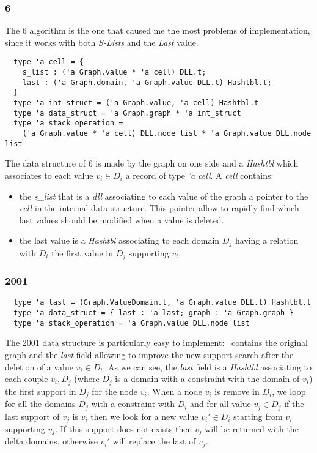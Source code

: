 \documentclass{rapport}
\begin{document}
\subsubsection{\ac{6}}

The \ac{6} algorithm is the one that caused me the most problems of implementation, since it works with both \textit{S-Lists} and the \textit{Last} value.

\begin{verbatim}
  type 'a cell = {
    s_list : ('a Graph.value * 'a cell) DLL.t;
    last : ('a Graph.domain, 'a Graph.value DLL.t) Hashtbl.t;
  }
  type 'a int_struct = ('a Graph.value, 'a cell) Hashtbl.t
  type 'a data_struct = 'a Graph.graph * 'a int_struct
  type 'a stack_operation =
    ('a Graph.value * 'a cell) DLL.node list * 'a Graph.value DLL.node list
\end{verbatim}

The data structure of \ac{6} is made by the graph on one side and a \textit{Hashtbl} which associates to each value $v_i \in D_i$ a record of type \textit{'a cell}. A \textit{cell} contains:
\begin{itemize}
  \item the \textit{s\_list} that is a \textit{dll} associating to each value of the graph a pointer to the \textit{cell} in the internal data structure. This pointer allow to rapidly find which last values should be modified when a value is deleted.
  \item the last value is a \textit{Hashtbl} associating to each domain $D_j$ having a relation with $D_i$ the first value in $D_j$ supporting $v_i$.
\end{itemize}

\subsubsection{\ac{2001}}

\begin{verbatim}
  type 'a last = (Graph.ValueDomain.t, 'a Graph.value DLL.t) Hashtbl.t
  type 'a data_struct = { last : 'a last; graph : 'a Graph.graph }
  type 'a stack_operation = 'a Graph.value DLL.node list
\end{verbatim}

The \ac{2001} data structure is particularly easy to implement: \ds\ contains the original graph and the \textit{last} field allowing to improve the new support search after the deletion of a value $v_i \in D_i$. As we can see, the \textit{last} field is a \textit{Hashtbl} associating to each couple $v_i, D_j$ (where $D_j$ is a domain with a constraint with the domain of $v_i$) the first support in $D_j$ for the node $v_i$. When a node $v_i$ is remove in $D_i$, we loop for all the domains $D_j$ with a constraint with $D_i$ and for all value $v_j \in D_j$ if the last support of $v_j$ is $v_i$ then we look for a new value $v_i' \in D_i$ starting from $v_i$ supporting $v_j$. If this support does not exists then $v_j$ will be returned with the delta domains, otherwise $v_i'$ will replace the last of $v_j$.
\end{document}
